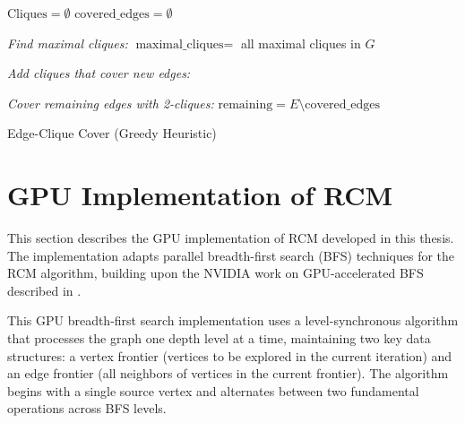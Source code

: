 \begin{algorithm}[H]

    \BlankLine

    $\text{Cliques} = \emptyset$\;
    $\text{covered\_edges} = \emptyset$\;
    \BlankLine

    \emph{Find maximal cliques:}\;
    $\text{maximal\_cliques} = $ all maximal cliques in $G$\;
    \BlankLine

    \emph{Add cliques that cover new edges:}\;
    \BlankLine

    \emph{Cover remaining edges with 2-cliques:}\;
    $\text{remaining} = E \setminus \text{covered\_edges}$\;

    \;

    \caption{Edge-Clique Cover (Greedy Heuristic)}
    \label{alg:edge_clique_cover}
\end{algorithm}

\section{GPU Implementation of RCM}
\label{sec:gpu_rcm}

This section describes the GPU implementation of RCM developed in this thesis. The implementation adapts parallel breadth-first search (BFS) techniques for the RCM algorithm, building upon the NVIDIA work on GPU-accelerated BFS described in \cite{merrill_scalable_nodate}.

This GPU breadth-first search implementation uses a level-synchronous algorithm that processes the graph one depth level at a time, maintaining two key data structures: a vertex frontier (vertices to be explored in the current iteration) and an edge frontier (all neighbors of vertices in the current frontier). The algorithm begins with a single source vertex and alternates between two fundamental operations across BFS levels.

